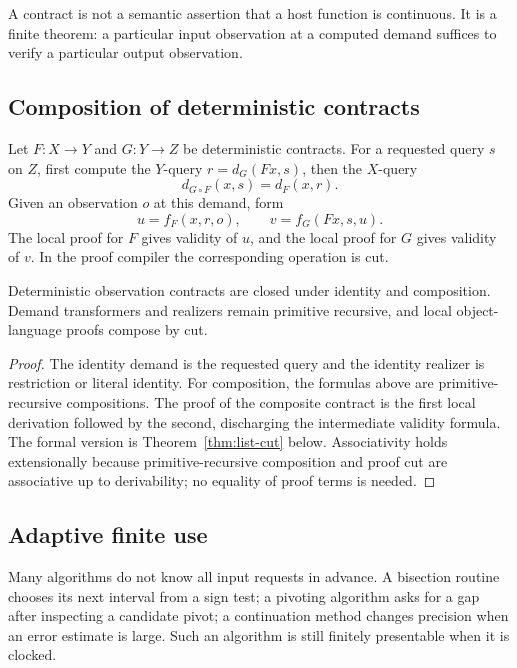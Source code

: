 A contract is not a semantic assertion that a host function is continuous.  It
is a finite theorem: a particular input observation at a computed demand
suffices to verify a particular output observation.

\subsection{Composition of deterministic contracts}

Let \(F:X\to Y\) and \(G:Y\to Z\) be deterministic contracts.  For a requested
query \(s\) on \(Z\), first compute the \(Y\)-query
\(r=d_G(Fx,s)\), then the \(X\)-query
\[
     d_{G\circ F}(x,s)=d_F(x,r).
\]
Given an observation \(o\) at this demand, form
\[
   u=f_F(x,r,o),\qquad v=f_G(Fx,s,u).
\]
The local proof for \(F\) gives validity of \(u\), and the local proof for
\(G\) gives validity of \(v\).  In the proof compiler the corresponding
operation is cut.

\begin{theorem}
Deterministic observation contracts are closed under identity and composition.
Demand transformers and realizers remain primitive recursive, and local
object-language proofs compose by cut.
\end{theorem}

\begin{proof}
The identity demand is the requested query and the identity realizer is
restriction or literal identity.  For composition, the formulas above are
primitive-recursive compositions.  The proof of the composite contract is the
first local derivation followed by the second, discharging the intermediate
validity formula.  The formal version is Theorem~\ref{thm:list-cut} below.
Associativity holds extensionally because primitive-recursive composition and
proof cut are associative up to derivability; no equality of proof terms is
needed.
\end{proof}

\subsection{Adaptive finite use}

Many algorithms do not know all input requests in advance.  A bisection routine
chooses its next interval from a sign test; a pivoting algorithm asks for a gap
after inspecting a candidate pivot; a continuation method changes precision
when an error estimate is large.  Such an algorithm is still finitely
presentable when it is clocked.

